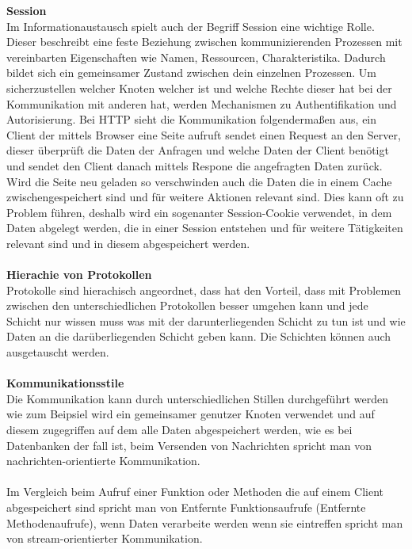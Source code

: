 \documentclass[a4paper,12pt]{article}
\begin{document}
\textbf{Session\\}
Im Informationaustausch spielt auch der Begriff Session eine wichtige Rolle. Dieser beschreibt eine feste Beziehung zwischen kommunizierenden Prozessen mit vereinbarten Eigenschaften wie Namen, Ressourcen, Charakteristika. Dadurch bildet sich ein gemeinsamer Zustand zwischen dein einzelnen Prozessen. Um sicherzustellen welcher Knoten welcher ist und welche Rechte dieser hat 
bei der Kommunikation mit anderen hat, werden Mechanismen zu Authentifikation und Autorisierung. Bei HTTP sieht die Kommunikation folgendermaßen aus, ein Client der mittels Browser eine Seite aufruft sendet einen Request an den Server, dieser überprüft die Daten der Anfragen und welche Daten der Client benötigt und sendet den Client danach mittels Respone die angefragten Daten zurück.\\
Wird die Seite neu geladen so verschwinden auch die Daten die in einem Cache zwischengespeichert sind und für weitere Aktionen relevant sind. Dies kann oft zu Problem führen, deshalb wird ein sogenanter Session-Cookie verwendet, in dem Daten abgelegt werden, die in einer Session entstehen und für weitere Tätigkeiten relevant sind und in diesem abgespeichert werden.\\ \\
\textbf{Hierachie von Protokollen\\}
Protokolle sind hierachisch angeordnet, dass hat den Vorteil, dass mit Problemen zwischen den unterschiedlichen Protokollen besser umgehen kann und jede Schicht nur wissen muss was mit der darunterliegenden Schicht zu tun ist und wie Daten an die darüberliegenden Schicht geben kann. Die Schichten können auch ausgetauscht werden.
\\\\
\textbf{Kommunikationsstile\\}
Die Kommunikation kann durch unterschiedlichen Stillen durchgeführt werden wie zum Beipsiel wird ein gemeinsamer genutzer Knoten verwendet und auf diesem zugegriffen auf dem alle Daten abgespeichert werden, wie es bei Datenbanken der fall ist, beim Versenden von Nachrichten spricht man von nachrichten-orientierte Kommunikation. \\\\
Im Vergleich beim Aufruf einer Funktion oder Methoden die auf einem Client abgespeichert sind
spricht man von Entfernte Funktionsaufrufe (Entfernte Methodenaufrufe), wenn Daten verarbeite werden wenn sie eintreffen spricht man von stream-orientierter Kommunikation.\\\\
\end{document}
